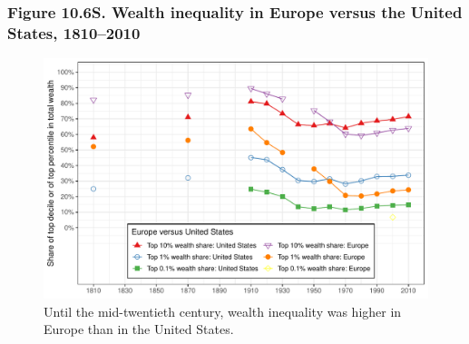 \documentclass[t]{beamer}\usepackage[]{graphicx}\usepackage[]{color}
\newenvironment{knitrout}{}{} %
\begin{document}
\begin{frame}[label=Figure_10_6S]
\frametitle{Figure 10.6S. Wealth inequality in Europe versus the United States, 1810--2010}
\begin{figure}[t]
\begin{minipage}[b]{\textwidth}
\centering
\begin{knitrout}\footnotesize
{}\color{fgcolor}

{\centering \includegraphics[width=1\linewidth]{figures/color/Figure_10_6S} 

}



\end{knitrout}
\caption{Until the mid-twentieth century, wealth inequality was higher in Europe than in the United States.}
\end{minipage}
\end{figure}
\end{frame}
\end{document}
